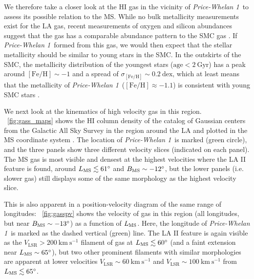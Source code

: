\documentclass[twocolumn]{aastex62}
\newcommand{\kms}{\ensuremath{\textrm{km}~\textrm{s}^{-1}}}
\newcommand{\feh}{\ensuremath{[\textrm{Fe} / \textrm{H}]}}
\newcommand{\hi}{H{\footnotesize I} }
\newcommand{\clustername}{\textsl{Price-Whelan 1}}
\begin{document}
We therefore take a closer look at the \hi gas in the vicinity of \clustername\ to assess its possible relation to the MS.
While no bulk metallicity measurements exist for the LA gas, recent measurements of oxygen and silicon abundances suggest that the gas has a comparable abundance pattern to the SMC gas \citep{Fox:2018, Richter:2018}.
If \clustername\ formed from this gas, we would then expect that the stellar metallicity should be similar to young stars in the SMC.
In the outskirts of the SMC, the metallicity distribution of the youngest stars ($\textrm{age} < 2~\textrm{Gyr}$) has a peak around $\feh \sim -1$ and a spread of $\sigma_{\feh} \sim 0.2~\textrm{dex}$, which at least means that the metallicity of \clustername\ ($\feh \approx -1.1$) is consistent with young SMC stars \citep{Dobbie:2014}.

We next look at the kinematics of high velocity gas in this region.
\figurename~\ref{fig:gass_maps} shows the \hi column density of the catalog of Gaussian centers \citep[producted with the techniques and software from][]{Nidever:2008} from the Galactic All Sky Survey \citep[GASS;][]{McClure-Griffiths:2009, Kalberla:2010} in the region around the LA and plotted in the MS coordinate system \citep[$L_{\rm MS}, B_{\rm MS}$;][]{Nidever:2008}.
The location of \clustername\ is marked (green circle), and the three panels show three different velocity slices (indicated on each panel).
The MS gas is most visible and densest at the highest velocities where the LA II feature is found, around $L_{\rm MS} \lesssim 61^\circ$ and $B_{\rm MS} \sim -12^\circ$, but the lower panels (i.e. slower gas) still displays some of the same morphology as the highest velocity slice.

This is also apparent in a position-velocity diagram of the same range of longitudes:
\figurename~\ref{fig:gasspv} shows the velocity of gas in this region (all longitudes, but near $B_{\rm MS} \sim -13^\circ$) as a function of $L_{\rm MS}$.
Here, the longitude of \clustername\ is marked as the dashed vertical (green) line.
The LA II feature is again visible as the $V_{\textrm{LSR}} > 200~\kms$ filament of gas at $L_{\rm MS} \lesssim 60^\circ$ (and a faint extension near $L_{\rm MS} \sim 65^\circ$), but two other prominent filaments with similar morphologies are apparent at lower velocities $V_{\textrm{LSR}} \sim 60~\kms$ and $V_{\textrm{LSR}} \sim 100~\kms$ from $L_{\rm MS} \lesssim 65^\circ$.
\end{document}
